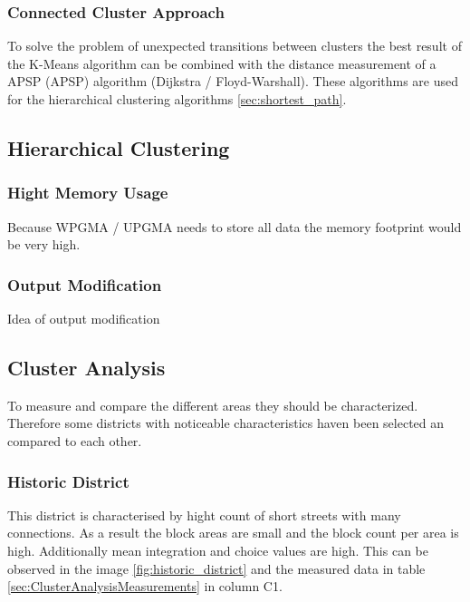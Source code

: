 \subsubsection{Connected Cluster Approach} \label{sec:connected_cluster_approach}
To solve the problem of unexpected transitions between clusters the best result of the K-Means algorithm can be combined with the distance measurement of a \acrlong{APSP} (\acrshort{APSP}) algorithm (Dijkstra / Floyd-Warshall). These algorithms are used for the hierarchical clustering algorithms \ref{sec:shortest_path}.

\pagebreak
\subsection{Hierarchical Clustering}

\subsubsection{Hight Memory Usage}
Because WPGMA / UPGMA needs to store all data the memory footprint would be very high. %

\subsubsection{Output Modification}
Idea of output modification

\pagebreak
\subsection{Cluster Analysis}
To measure and compare the different areas they should be characterized. Therefore some districts with noticeable characteristics haven been selected an compared to each other.


\subsubsection{Historic District}
\label{sec:historyDistinct}
This district is characterised by hight count of short streets with many connections. As a result the block areas are small and the block count per area is high. Additionally mean integration and choice values are high. This can be observed in the image \ref{fig:historic_district} and the measured data in table \ref{sec:ClusterAnalysisMeasurements} in column C1.

